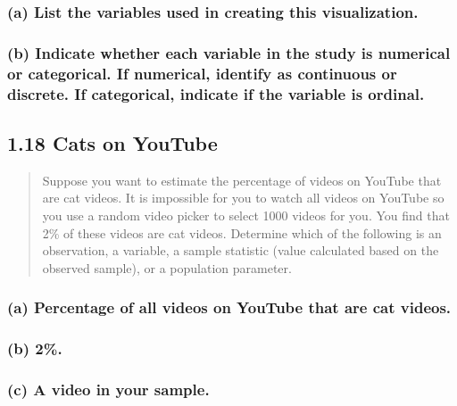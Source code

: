\documentclass[
]{article}
\begin{document}
\subsubsection{(a) List the variables used in creating this
visualization.}\label{a-list-the-variables-used-in-creating-this-visualization.}

\subsubsection{(b) Indicate whether each variable in the study is
numerical or categorical. If numerical, identify as continuous or
discrete. If categorical, indicate if the variable is
ordinal.}\label{b-indicate-whether-each-variable-in-the-study-is-numerical-or-categorical.-if-numerical-identify-as-continuous-or-discrete.-if-categorical-indicate-if-the-variable-is-ordinal.}

\subsection{1.18 Cats on YouTube}\label{cats-on-youtube}

\begin{quote}
Suppose you want to estimate the percentage of videos on YouTube that
are cat videos. It is impossible for you to watch all videos on YouTube
so you use a random video picker to select 1000 videos for you. You find
that 2\% of these videos are cat videos. Determine which of the
following is an observation, a variable, a sample statistic (value
calculated based on the observed sample), or a population parameter.
\end{quote}

\subsubsection{(a) Percentage of all videos on YouTube that are cat
videos.}\label{a-percentage-of-all-videos-on-youtube-that-are-cat-videos.}

\subsubsection{(b) 2\%.}\label{b-2.}

\subsubsection{(c) A video in your
sample.}\label{c-a-video-in-your-sample.}
\end{document}
